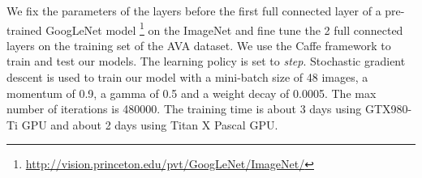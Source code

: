 \documentclass[letterpaper]{article} %
\begin{document}

We fix the  parameters of the layers before the first full connected layer of a pre-trained GoogLeNet model \footnote{\url{http://vision.princeton.edu/pvt/GoogLeNet/ImageNet/}} on the ImageNet \cite{DengCVPR2009} and fine tune the 2 full connected layers on the training set of the AVA dataset. We use the Caffe framework \cite{JiaMM2017} to train and test our models. The learning policy is set to \emph{step}. Stochastic gradient descent is used to train our model with a mini-batch size of 48 images, a momentum of 0.9, a gamma of 0.5 and a weight decay of 0.0005. The max number of iterations is 480000. The training time is about 3 days using GTX980-Ti GPU and about 2 days using Titan X Pascal GPU.





\end{document}
